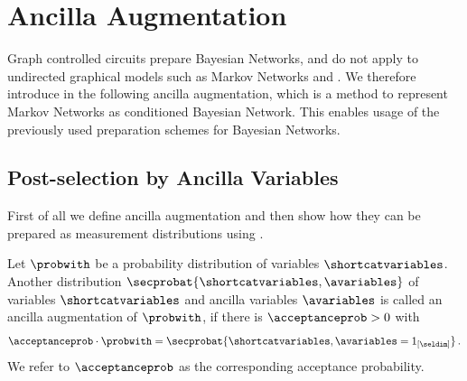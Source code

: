 \section{Ancilla Augmentation}


Graph controlled circuits prepare Bayesian Networks, and do not apply to undirected graphical models such as Markov Networks and \ComputationActivationNetworks{}.
We therefore introduce in the following ancilla augmentation, which is a method to represent Markov Networks as conditioned Bayesian Network.
This enables usage of the previously used preparation schemes for Bayesian Networks.

\subsection{Post-selection by Ancilla Variables}

First of all we define ancilla augmentation and then show how they can be prepared as measurement distributions using \activationCircuits{}.

\begin{definition}
    Let $\probwith$ be a probability distribution of variables $\shortcatvariables$.
    Another distribution $\secprobat{\shortcatvariables,\avariables}$ of variables $\shortcatvariables$ and ancilla variables $\avariables$ is called an ancilla augmentation of $\probwith$, if there is $\acceptanceprob>0$ with
    \begin{align*}
        \acceptanceprob \cdot \probwith
        = \secprobat{\shortcatvariables,\avariables=1_{[\seldim]}} \, .
    \end{align*}
    We refer to $\acceptanceprob$ as the corresponding acceptance probability.
\end{definition}

%

